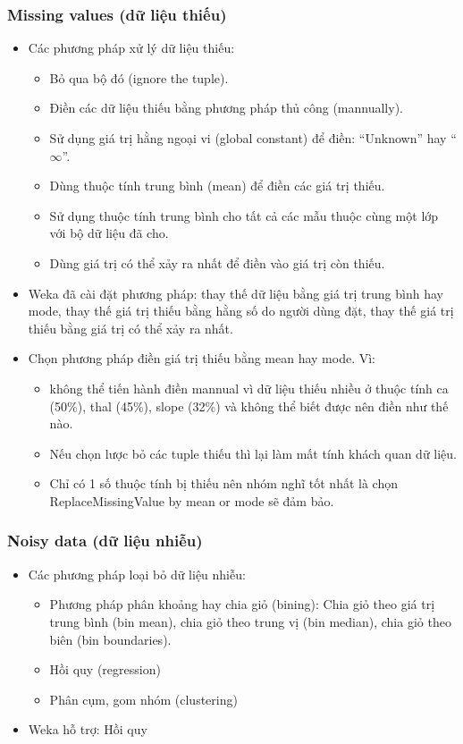 \subsubsection{Missing values (dữ liệu thiếu)}
\begin{itemize}
	\item Các phương pháp xử lý dữ liệu thiếu: 
	\begin{itemize}
		\item	Bỏ qua bộ đó (ignore the tuple).
\item	Điền các dữ liệu thiếu bằng phương pháp thủ công (mannually).
\item	Sử dụng giá trị hằng ngoại vi (global constant) để điền: “Unknown” hay “$\infty$”.
\item	Dùng thuộc tính trung bình (mean) để điền các giá trị thiếu.
\item	Sử dụng thuộc tính trung bình cho tất cả các mẫu thuộc cùng một lớp với bộ dữ liệu đã cho.
\item	Dùng giá trị có thể xảy ra nhất để điền vào giá trị còn thiếu.

	\end{itemize}
	\item Weka đã cài đặt phương pháp: thay thế dữ liệu bằng giá trị trung bình hay mode, thay thế giá trị thiếu bằng hằng số do người dùng đặt, thay thế giá trị thiếu bằng giá trị có thể xảy ra nhất.
	\item Chọn phương pháp điền giá trị thiếu bằng mean hay mode. Vì:
	\begin{itemize}
	\item	không thể tiến hành điền mannual vì dữ liệu thiếu nhiều ở thuộc tính ca (50\%), thal (45\%), slope (32\%) và không thể biết được nên điền như thế nào.
\item	Nếu chọn lược bỏ các tuple thiếu thì lại làm mất tính khách quan dữ liệu.
\item	Chỉ có 1 số thuộc tính bị thiếu nên nhóm nghĩ tốt nhất là chọn ReplaceMissingValue by mean or mode sẽ đảm bảo. 

	\end{itemize}
\end{itemize}

\subsubsection{Noisy data (dữ liệu nhiễu)}
\begin{itemize}
\item Các phương pháp loại bỏ dữ liệu nhiễu:
\begin{itemize}
\item	Phương pháp phân khoảng hay chia giỏ (bining): Chia giỏ theo giá trị trung bình (bin mean), chia giỏ theo trung vị (bin median), chia giỏ theo biên (bin boundaries).
\item	Hồi quy (regression)
\item	Phân cụm, gom nhóm (clustering)

\end{itemize}
\item Weka hỗ trợ: Hồi quy 

\end{itemize}

